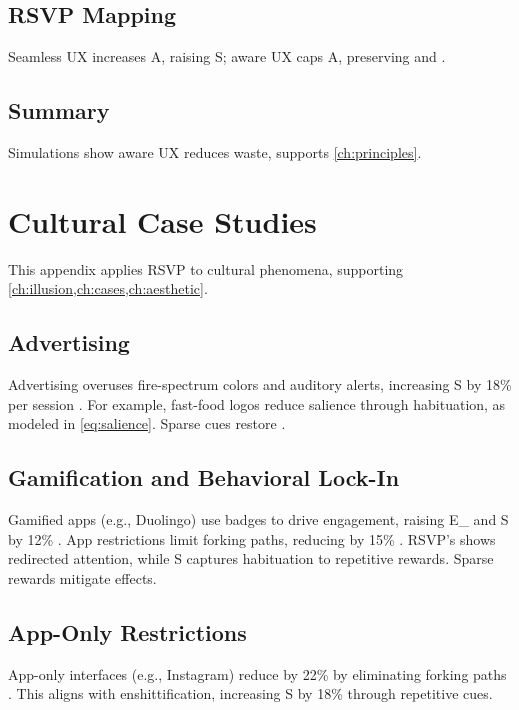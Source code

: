 \documentclass[openany]{book}
\newcommand{\PhiS}{\Phi} %
\newcommand{\vvec}{\mathbf{v}} %
\newcommand{\Sent}{S} %
\newcommand{\Eint}{E_{\mathrm{int}}} %
\newcommand{\Auton}{\mathcal{A}} %
\begin{document}
\section{RSVP Mapping}
\label{sec:sim-rsvp}
Seamless UX increases A, raising S; aware UX caps A, preserving \PhiS{} and \Auton{}.

\section{Summary}
Simulations show aware UX reduces waste, supports \cref{ch:principles}.

\chapter{Cultural Case Studies}
\label{app:cultural}

This appendix applies RSVP to cultural phenomena, supporting \cref{ch:illusion,ch:cases,ch:aesthetic}.

\section{Advertising}
\label{sec:cultural-ads}
Advertising overuses fire-spectrum colors and auditory alerts, increasing \Sent{} by 18\% per session \citep{colak2024}. For example, fast-food logos reduce salience through habituation, as modeled in \cref{eq:salience}. Sparse cues restore \PhiS{}.

\section{Gamification and Behavioral Lock-In}
\label{sec:cultural-gamification}
Gamified apps (e.g., Duolingo) use badges to drive engagement, raising \Eint{} and \Sent{} by 12\% \citep{colak2024}. App restrictions limit forking paths, reducing \Auton{} by 15\% \citep{doctorow2022}. RSVP’s \vvec{} shows redirected attention, while \Sent{} captures habituation to repetitive rewards. Sparse rewards mitigate effects.

\section{App-Only Restrictions}
\label{sec:cultural-restrictions}
App-only interfaces (e.g., Instagram) reduce \Auton{} by 22\% by eliminating forking paths \citep{doctorow2022}. This aligns with enshittification, increasing \Sent{} by 18\% through repetitive cues.
\end{document}
